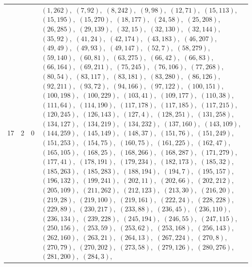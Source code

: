 \documentclass[11pt]{article}
\begin{document}
\begin{longtable}{@{}rrl>{\raggedright\arraybackslash}p{}@{}}
17 & 2 & $0$ & $(1,262)$,\allowbreak\ $(7,92)$,\allowbreak\ $(8,242)$,\allowbreak\ $(9,98)$,\allowbreak\ $(12,71)$,\allowbreak\ $(15,113)$,\allowbreak\ $(15,195)$,\allowbreak\ $(15,270)$,\allowbreak\ $(18,177)$,\allowbreak\ $(24,58)$,\allowbreak\ $(25,208)$,\allowbreak\ $(26,285)$,\allowbreak\ $(29,139)$,\allowbreak\ $(32,15)$,\allowbreak\ $(32,130)$,\allowbreak\ $(32,144)$,\allowbreak\ $(35,92)$,\allowbreak\ $(41,24)$,\allowbreak\ $(42,174)$,\allowbreak\ $(43,183)$,\allowbreak\ $(46,207)$,\allowbreak\ $(49,49)$,\allowbreak\ $(49,93)$,\allowbreak\ $(49,147)$,\allowbreak\ $(52,7)$,\allowbreak\ $(58,279)$,\allowbreak\ $(59,140)$,\allowbreak\ $(60,81)$,\allowbreak\ $(63,275)$,\allowbreak\ $(66,42)$,\allowbreak\ $(66,83)$,\allowbreak\ $(66,164)$,\allowbreak\ $(69,211)$,\allowbreak\ $(75,245)$,\allowbreak\ $(76,106)$,\allowbreak\ $(77,268)$,\allowbreak\ $(80,54)$,\allowbreak\ $(83,117)$,\allowbreak\ $(83,181)$,\allowbreak\ $(83,280)$,\allowbreak\ $(86,126)$,\allowbreak\ $(92,211)$,\allowbreak\ $(93,72)$,\allowbreak\ $(94,166)$,\allowbreak\ $(97,122)$,\allowbreak\ $(100,151)$,\allowbreak\ $(100,198)$,\allowbreak\ $(100,229)$,\allowbreak\ $(103,41)$,\allowbreak\ $(109,177)$,\allowbreak\ $(110,38)$,\allowbreak\ $(111,64)$,\allowbreak\ $(114,190)$,\allowbreak\ $(117,178)$,\allowbreak\ $(117,185)$,\allowbreak\ $(117,215)$,\allowbreak\ $(120,245)$,\allowbreak\ $(126,143)$,\allowbreak\ $(127,4)$,\allowbreak\ $(128,251)$,\allowbreak\ $(131,258)$,\allowbreak\ $(134,127)$,\allowbreak\ $(134,219)$,\allowbreak\ $(134,232)$,\allowbreak\ $(137,160)$,\allowbreak\ $(143,109)$,\allowbreak\ $(144,259)$,\allowbreak\ $(145,149)$,\allowbreak\ $(148,37)$,\allowbreak\ $(151,76)$,\allowbreak\ $(151,249)$,\allowbreak\ $(151,253)$,\allowbreak\ $(154,75)$,\allowbreak\ $(160,75)$,\allowbreak\ $(161,225)$,\allowbreak\ $(162,47)$,\allowbreak\ $(165,105)$,\allowbreak\ $(168,25)$,\allowbreak\ $(168,266)$,\allowbreak\ $(168,287)$,\allowbreak\ $(171,279)$,\allowbreak\ $(177,41)$,\allowbreak\ $(178,191)$,\allowbreak\ $(179,234)$,\allowbreak\ $(182,173)$,\allowbreak\ $(185,32)$,\allowbreak\ $(185,263)$,\allowbreak\ $(185,283)$,\allowbreak\ $(188,194)$,\allowbreak\ $(194,7)$,\allowbreak\ $(195,157)$,\allowbreak\ $(196,132)$,\allowbreak\ $(199,241)$,\allowbreak\ $(202,11)$,\allowbreak\ $(202,66)$,\allowbreak\ $(202,212)$,\allowbreak\ $(205,109)$,\allowbreak\ $(211,262)$,\allowbreak\ $(212,123)$,\allowbreak\ $(213,30)$,\allowbreak\ $(216,20)$,\allowbreak\ $(219,28)$,\allowbreak\ $(219,100)$,\allowbreak\ $(219,161)$,\allowbreak\ $(222,24)$,\allowbreak\ $(228,228)$,\allowbreak\ $(229,89)$,\allowbreak\ $(230,217)$,\allowbreak\ $(233,88)$,\allowbreak\ $(236,45)$,\allowbreak\ $(236,110)$,\allowbreak\ $(236,134)$,\allowbreak\ $(239,228)$,\allowbreak\ $(245,194)$,\allowbreak\ $(246,55)$,\allowbreak\ $(247,115)$,\allowbreak\ $(250,156)$,\allowbreak\ $(253,59)$,\allowbreak\ $(253,62)$,\allowbreak\ $(253,168)$,\allowbreak\ $(256,143)$,\allowbreak\ $(262,160)$,\allowbreak\ $(263,21)$,\allowbreak\ $(264,13)$,\allowbreak\ $(267,224)$,\allowbreak\ $(270,8)$,\allowbreak\ $(270,79)$,\allowbreak\ $(270,202)$,\allowbreak\ $(273,58)$,\allowbreak\ $(279,126)$,\allowbreak\ $(280,276)$,\allowbreak\ $(281,200)$,\allowbreak\ $(284,3)$,\allowbreak\ 
\end{longtable}
\end{document}
